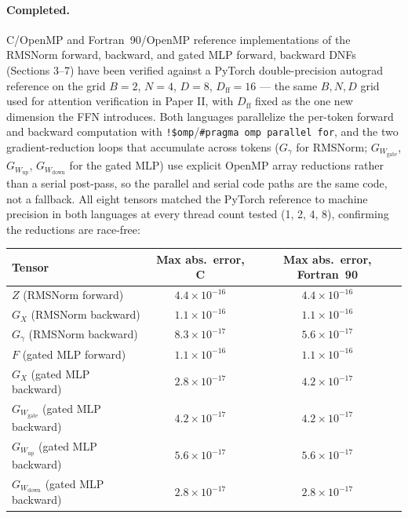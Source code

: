\documentclass[11pt]{article}
\theoremstyle{definition}
\begin{document}
\paragraph{Completed.} C/OpenMP and Fortran~90/OpenMP reference
implementations of the RMSNorm forward, backward, and gated MLP
forward, backward DNFs (Sections 3--7) have been verified against a
PyTorch double-precision autograd reference on the grid $B{=}2$,
$N{=}4$, $D{=}8$, $D_{\mathrm{ff}}{=}16$ --- the same $B,N,D$ grid used
for attention verification in Paper II, with $D_{\mathrm{ff}}$ fixed as
the one new dimension the FFN introduces. Both languages parallelize
the per-token forward and backward computation with
\texttt{!\$omp}/\texttt{\#pragma omp parallel for}, and the two
gradient-reduction loops that accumulate across tokens
($G_{\gamma}$ for RMSNorm; $G_{W_{\mathrm{gate}}}$, $G_{W_{\mathrm{up}}}$,
$G_{W_{\mathrm{down}}}$ for the gated MLP) use explicit OpenMP array
reductions rather than a serial post-pass, so the parallel and serial
code paths are the same code, not a fallback. All eight tensors
matched the PyTorch reference to machine precision in both languages at
every thread count tested (1, 2, 4, 8), confirming the reductions are
race-free:

\begin{center}
\begin{tabular}{lcc}
\hline
Tensor & Max abs.\ error, C & Max abs.\ error, Fortran~90 \\
\hline
$Z$ (RMSNorm forward) & $4.4\times10^{-16}$ & $4.4\times10^{-16}$ \\
$G_X$ (RMSNorm backward) & $1.1\times10^{-16}$ & $1.1\times10^{-16}$ \\
$G_{\gamma}$ (RMSNorm backward) & $8.3\times10^{-17}$ & $5.6\times10^{-17}$ \\
$F$ (gated MLP forward) & $1.1\times10^{-16}$ & $1.1\times10^{-16}$ \\
$G_X$ (gated MLP backward) & $2.8\times10^{-17}$ & $4.2\times10^{-17}$ \\
$G_{W_{\mathrm{gate}}}$ (gated MLP backward) & $4.2\times10^{-17}$ & $4.2\times10^{-17}$ \\
$G_{W_{\mathrm{up}}}$ (gated MLP backward) & $5.6\times10^{-17}$ & $5.6\times10^{-17}$ \\
$G_{W_{\mathrm{down}}}$ (gated MLP backward) & $2.8\times10^{-17}$ & $2.8\times10^{-17}$ \\
\hline
\end{tabular}
\end{center}
\end{document}
